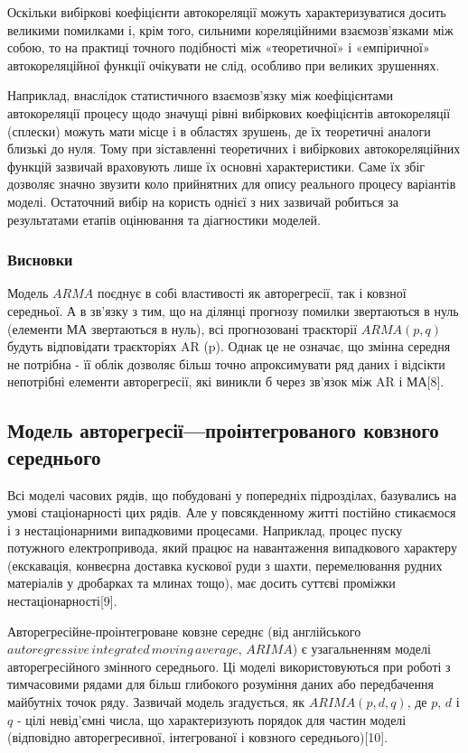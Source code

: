 Оскільки вибіркові коефіцієнти автокореляції можуть характеризуватися досить великими помилками і, крім того, сильними кореляційними взаємозв'язками між собою, то на практиці точного подібності між «теоретичної» і «емпіричної» автокореляційної функції очікувати не слід, особливо при великих зрушеннях. 

Наприклад, внаслідок статистичного взаємозв'язку між коефіцієнтами автокореляції процесу щодо значущі рівні вибіркових коефіцієнтів автокореляції (сплески) можуть мати місце і в областях зрушень, де їх теоретичні аналоги близькі до нуля. Тому при зіставленні теоретичних і вибіркових автокореляційних функцій зазвичай враховують лише їх основні характеристики. Саме їх збіг дозволяє значно звузити коло прийнятних для опису реального процесу варіантів моделі. Остаточний вибір на користь однієї з них зазвичай робиться за результатами етапів оцінювання та діагностики моделей.

\subsubsection{Висновки}

Модель $ARMA$ поєднує в собі властивості як авторегресії, так і ковзної середньої. А в зв'язку з тим, що на ділянці прогнозу помилки звертаються в нуль (елементи МА звертаються в нуль), всі прогнозовані траєкторії $ARMA(p, q)$ будуть відповідати траєкторіях AR (p). Однак це не означає, що змінна середня не потрібна - її облік дозволяє більш точно апроксимувати ряд даних і відсікти непотрібні елементи авторегресії, які виникли б через зв'язок між AR і МА[8].

\subsection{Модель авторегресії—проінтегрованого ковзного середнього}

Всі моделі часових рядів, що побудовані у попередніх підрозділах, базувались на умові стаціонарності цих рядів. Але у повсякденному житті постійно стикаємося і з нестаціонарними випадковими процесами. Наприклад, процес пуску потужного електропривода, який працює на навантаження випадкового характеру (екскавація, конвеєрна доставка кускової руди з шахти, перемелювання рудних матеріалів у дробарках та млинах тощо), має досить суттєві проміжки нестаціонарності[9].

Авторегресійне-проінтегроване ковзне середнє (від англійського $autoregressive \, integrated \, moving \, average$, $ARIMA$) є узагальненням моделі авторегресійного змінного середнього. Ці моделі використовуються при роботі з тимчасовими рядами для більш глибокого розуміння даних або передбачення майбутніх точок ряду. Зазвичай модель згадується, як $ARIMA(p,d,q)$, де $p$, $d$ і $q$ - цілі невід'ємні числа, що характеризують порядок для частин моделі (відповідно авторегресивної, інтегрованої і ковзного середнього)[10].

